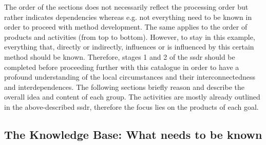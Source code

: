 The order of the sections does not necessarily reflect the processing order but rather indicates dependencies whereas e.g. not everything need to be known in order to proceed with method development. The same applies to the order of products and activities (from top to bottom). However, to stay in this example, everything that, directly or indirectly, influences or is influenced by this certain method should be known. Therefore, stages 1 and 2 of the \acrshort{ssdr} should be completed before proceeding further with this catalogue in order to have a profound understanding of the local circumstances and their interconnectedness and interdependences.\newline
The following sections briefly reason and describe the overall idea and content of each group. The activities are mostly already outlined in the above-described \acrshort{ssdr}, therefore the focus lies on the products of each goal. 

\subsection{The Knowledge Base: What needs to be known}\label{subsubsec:knowledge}

